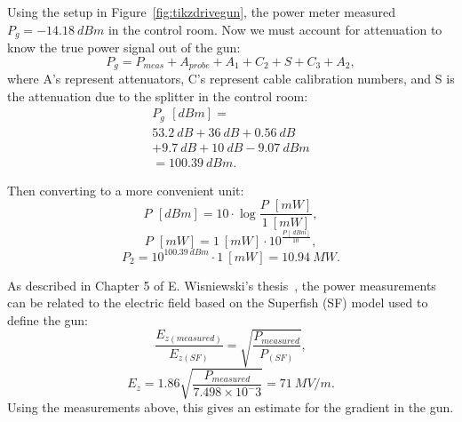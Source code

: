 Using the setup in Figure~\ref{fig:tikzdrivegun}, the power meter measured  $P_{g} = \SI{-14.18}{dBm}$
in the control room. Now we must account for attenuation to know the true power
signal out of the gun: 
\begin{equation}
P_g =P_{meas} + A_{probe}+A_1 + C_2 + S + C_3 + A_2, 
\end{equation}
where A's represent attenuators, C's represent cable calibration numbers, 
and S is the attenuation due to the splitter in the control room:
\begin{equation*}
\begin{aligned}
P_g \, \SI{}{[dBm]} = \\
\SI{53.2}{dB} + \SI{36}{dB} + \SI{0.56}{dB} \\
 + \SI{9.7}{dB}+ \SI{10}{dB} - \SI{9.07}{dBm} \\
 = \SI{100.39}{dBm}.
\end{aligned}
\end{equation*}

Then converting to a more convenient unit: 
\begin{equation}
P \, \SI{}{[dBm]} = 10 \cdot \log{\frac{P \, \SI{}{[mW]}}{\SI{1}{[mW]}}},
\end{equation}
\begin{equation} \label{eq:dbmtomw}
P \, \SI{}{[mW]} = \SI{1}{[mW]} \cdot 10^{\frac{P \, [\SI{}{dBm}]}{\SI{10}{}}},
\end{equation}
\begin{equation} 
P_2 = 10^{\SI{100.39}{dBm}} \cdot  \SI{1}{[mW]} = \SI{10.94}{MW}. 
\end{equation}


As described in Chapter 5 of E. Wisniewski's thesis~\cite{eric}, 
the power measurements can be related to the electric field 
based on the Superfish (SF) \cite{superfish} model used to define the gun:
\begin{equation}
	\frac{E_{z \left(measured\right)}}{E_{z(SF)}} = \sqrt{\frac{P_{measured}}{P_{(SF)}}},
\end{equation}
\begin{equation}
	E_z = 1.86\sqrt{\frac{P_{measured}}{7.498\times10^-3}} = \SI{71}{MV/m}.
\end{equation}
Using the measurements above, this gives an estimate for the gradient in the gun.


